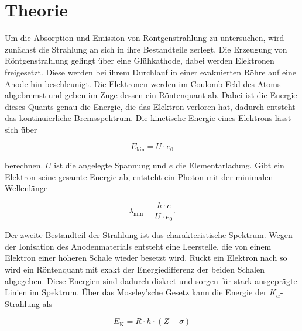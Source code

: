 \section{Theorie}
\label{sec:Theorie}




Um die Absorption und Emission von Röntgenstrahlung zu untersuchen, wird zunächst die Strahlung an sich in ihre Bestandteile zerlegt.
Die Erzeugung von Röntgenstrahlung gelingt über eine Glühkathode, dabei werden Elektronen freigesetzt.
Diese werden bei ihrem Durchlauf in einer evakuierten Röhre auf eine Anode hin beschleunigt.
Die Elektronen werden im Coulomb-Feld des Atoms abgebremst und geben im Zuge dessen ein Röntenquant ab.
Dabei ist die Energie dieses Quants genau die Energie, die das Elektron verloren hat, dadurch entsteht das kontinuierliche Bremsspektrum.
Die kinetische Energie eines Elektrons lässt sich über 

\begin{equation}
    E_\text{kin} = U \cdot e_0
    \label{eq:ekin}
\end{equation}

berechnen. $U$ ist die angelegte Spannung und $e$ die Elementarladung.
Gibt ein Elektron seine gesamte Energie ab, entsteht ein Photon mit der minimalen Wellenlänge 

\begin{equation}
    \lambda _\text{min} = \frac{h \cdot c}{U \cdot e_0}.
    \label{eq:lambdamin}
\end{equation}

Der zweite Bestandteil der Strahlung ist das charakteristische Spektrum.
Wegen der Ionisation des Anodenmaterials entsteht eine Leerstelle, die von einem Elektron einer höheren Schale wieder besetzt wird.
Rückt ein Elektron nach so wird ein Röntenquant mit exakt der Energiedifferenz der beiden Schalen abgegeben.
Diese Energien sind dadurch diskret und sorgen für stark ausgeprägte Linien im Spektrum.
Über das Moseley'sche Gesetz kann die Energie der $K_\alpha$-Strahlung als 

\begin{equation}
    E_\text{K} = R \cdot h \cdot \left(Z - \sigma\right)
    \label{eq:moseley}
\end{equation}

